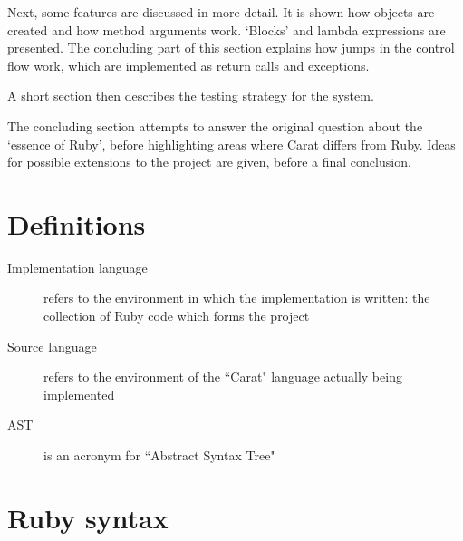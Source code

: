 Next, some features are discussed in more detail. It is shown how objects are created and how method arguments work. `Blocks' and lambda expressions are presented. The concluding part of this section explains how jumps in the control flow work, which are implemented as return calls and exceptions.

A short section then describes the testing strategy for the system.

The concluding section attempts to answer the original question about the `essence of Ruby', before highlighting areas where Carat differs from Ruby. Ideas for possible extensions to the project are given, before a final conclusion.

\section{Definitions}

\begin{description}
	\item[Implementation language] refers to the environment in which the implementation is written: the collection of Ruby code which forms the project
	\item[Source language] refers to the environment of the ``Carat" language actually being implemented
	\item[AST] is an acronym for ``Abstract Syntax Tree"
\end{description}

\section{Ruby syntax}

